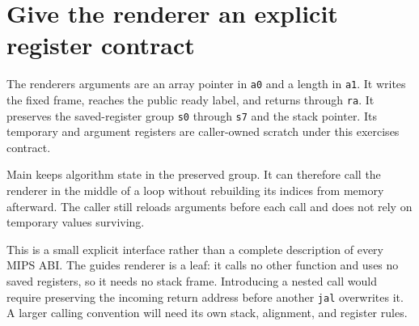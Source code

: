 \section{Give the renderer an explicit register
  contract}\label{009-sorting-visualizer-p02-give-the-renderer-an-explicit-register-contract}

The renderer\textquotesingle s arguments are an array pointer in
\texttt{a0} and a length in \texttt{a1}. It writes the fixed frame,
reaches the public ready label, and returns through \texttt{ra}. It
preserves the saved-register group \texttt{s0} through \texttt{s7} and
the stack pointer. Its temporary and argument registers are caller-owned
scratch under this exercise\textquotesingle s contract.

Main keeps algorithm state in the preserved group. It can therefore call
the renderer in the middle of a loop without rebuilding its indices from
memory afterward. The caller still reloads arguments before each call
and does not rely on temporary values surviving.

This is a small explicit interface rather than a complete description of
every MIPS ABI. The guide\textquotesingle s renderer is a leaf: it calls
no other function and uses no saved registers, so it needs no stack
frame. Introducing a nested call would require preserving the incoming
return address before another \texttt{jal} overwrites it. A larger
calling convention will need its own stack, alignment, and register
rules.
